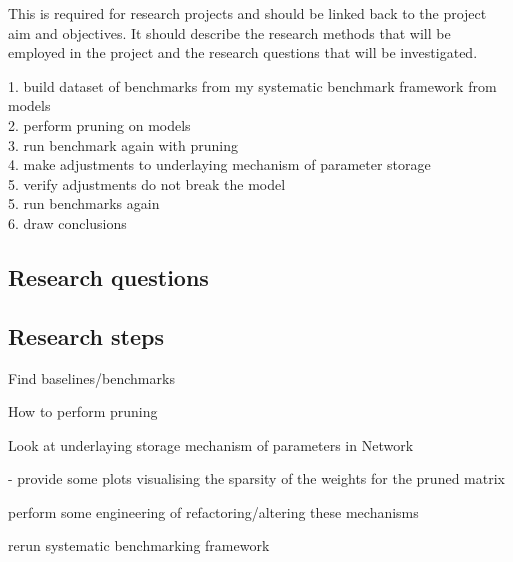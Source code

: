 \documentclass[../../D1.tex]{subfiles}
\begin{document}
This is required for research projects and should be linked
back to the project aim and objectives. It should describe the research methods that
will be employed in the project and the research questions that will be investigated.

1. build dataset of benchmarks from my systematic benchmark framework from models\\
2. perform pruning on models\\
3. run benchmark again with pruning\\
4. make adjustments to underlaying mechanism of parameter storage\\
5. verify adjustments do not break the model\\
5. run benchmarks again\\
6. draw conclusions\\


\subsection{Research questions}


\subsection{Research steps}

Find baselines/benchmarks

How to perform pruning

Look at underlaying storage mechanism of parameters in Network

 - provide some plots visualising the sparsity of the weights for the pruned matrix

perform some engineering of refactoring/altering these mechanisms

rerun systematic benchmarking framework
\end{document}
